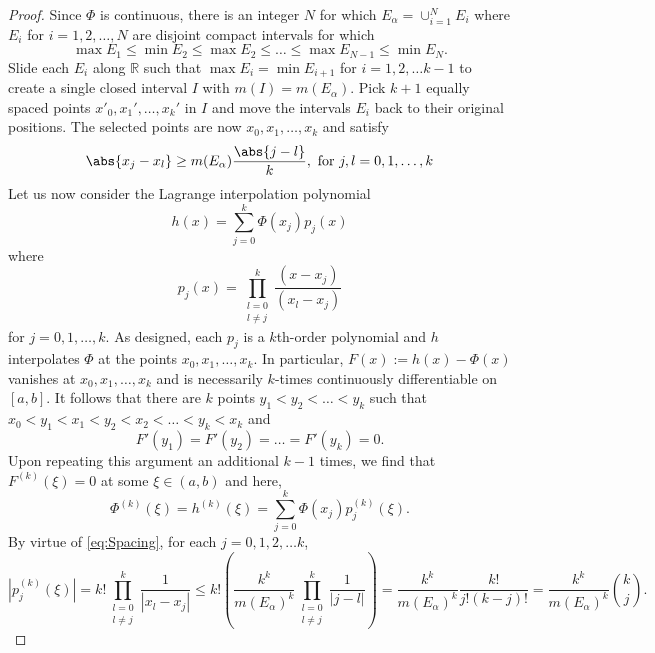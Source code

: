 \documentclass[11pt, letter]{book}
\newcommand\R{\mathbb{R}}
\newcommand{\f}[2]{\frac{#1}{#2}}
\newcommand{\al}{\alpha}
\begin{document}
\begin{proof}
Since $\Phi$ is continuous, there is an integer $N$ for which $E_\al = \cup^N_{i=1}E_i$ where $E_i$ for $i=1,2,\dots,N$ are disjoint compact intervals for which
\begin{equation*}
    \max{E_1} \leq \min{E_2} \leq \max{E_2} \leq \dots \leq \max{E_{N-1}}  \leq \min{E_N}.
\end{equation*}
Slide each $E_i$ along $\R$ such that $\max{E_i} = \min{E_{i+1}}$ for $i=1,2,\dots k-1$ to create a single closed interval $I$ with $m(I) = m(E_\al)$. Pick $k+1$ equally spaced points $x'_0,x_1',\dots,x_k'$ in $I$ and move the intervals $E_i$ back to their original positions. The selected points are now $x_0,x_1,\dots,x_k$ and satisfy
\begin{equation}\label{eq:Spacing}
    \abs{x_j - x_l} \geq m(E_\al)\f{\abs{j-l}}{k}, \mbox{ for } j,l = 0,1,\dots,k 
\end{equation}
Let us now consider the Lagrange interpolation polynomial
\begin{equation*}
    h(x)=\sum_{j=0}^k\Phi(x_j)p_j(x)
\end{equation*}
where
\begin{equation*}
    p_j(x)=\prod_{\substack{l=0\\l\neq j}}^k\frac{(x-x_j)}{(x_l-x_j)}
\end{equation*}
for $j=0,1,\dots,k$. As designed, each $p_j$ is a $k$th-order polynomial and $h$ interpolates $\Phi$ at the points $x_0,x_1,\dots,x_k$. In particular, $F(x):=h(x)-\Phi(x)$ vanishes at $x_0,x_1,\dots,x_k$ and is necessarily $k$-times continuously differentiable on $[a,b]$. It follows that there are $k$ points $y_1<y_2<\dots < y_k$ such that $x_0 < y_1 < x_1 < y_2 < x_2 < \dots < y_k < x_k$ and
\begin{equation*}
    F'(y_1) = F'(y_2) = \dots = F'(y_k) = 0.
\end{equation*}
Upon repeating this argument an additional $k-1$ times, we find that $F^{(k)}(\xi) = 0$ at some $\xi\in (a,b)$ and here,
\begin{equation*}
    \Phi^{(k)}(\xi) = h^{(k)}(\xi) = \sum_{j=0}^k \Phi(x_j)p_j^{(k)}(\xi).
\end{equation*}
By virtue of \eqref{eq:Spacing}, for each $j=0,1,2,\dots k$,
\begin{equation*}
|p_j^{(k)}(\xi)|
=
k!\prod_{\substack{l=0\\ l\neq j}}^k\frac{1}{|x_l-x_j|}\leq k!\left(\frac{k^k}{m(E_\alpha)^k}\prod_{\substack{l=0\\l\neq j}}^k\frac{1}{|j-l|}\right)=\frac{ k^k}{m(E_\alpha)^k}\frac{k!}{j!(k-j)!}=\frac{k^k}{m(E_\alpha)^k} {k\choose j}.

\end{equation*}
\end{proof}
\end{document}
